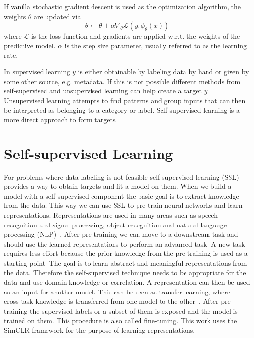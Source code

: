 \documentclass{article}
\begin{document}
\noindent If vanilla stochastic gradient descent is used as the optimization algorithm, the weights $\theta$
are updated via 
\begin{equation}
    \theta \xleftarrow{} \theta + \alpha\nabla_\theta {\mathcal L}(y, \phi_\theta(x))
\end{equation}
where ${\mathcal L}$ is the loss function and gradients are applied w.r.t. the weights of the predictive
model. $\alpha$ is the step size parameter, usually referred to as the learning rate.

\noindent In supervised learning $y$ is either obtainable by labeling data by hand or given
by some other source, e.g. metadata. If this is not possible different methods from
self-supervised and unsupervised learning can help create a target $y$.\\
Unsupervised learning attempts to find patterns and group inputs that can then be 
interpreted as belonging to a category or label.
Self-supervised learning is a more direct approach to form targets.

\section{Self-supervised Learning}
For problems where data labeling is not feasible self-supervised learning (SSL)
provides a way to obtain targets and fit a model on them. 
When we build a model with a self-supervised component the basic goal is to extract knowledge from the data. 
This way we can use SSL to pre-train neural networks and learn representations. Representations are used in many areas
such as speech recognition and signal processing, object recognition and natural language processing (NLP)~\cite{6472238}.
After pre-training we can move to a downstream task and should use the learned representations to perform an advanced task.
A new task requires less effort because the prior knowledge from the pre-training is used as a starting point.
The goal is to learn abstract and meaningful representations from the data. Therefore the self-supervised technique
needs to be appropriate for the data and use domain knowledge or correlation.
A representation can then be used as an input for another model. This can be seen as transfer learning, where, cross-task knowledge is
transferred from one model to the other~\cite{6472238}.
After pre-training the supervised labels or a subset of them is exposed and the model is trained
on them. This procedure is also called fine-tuning. 
This work uses the SimCLR framework for the purpose of learning representations.
\end{document}

